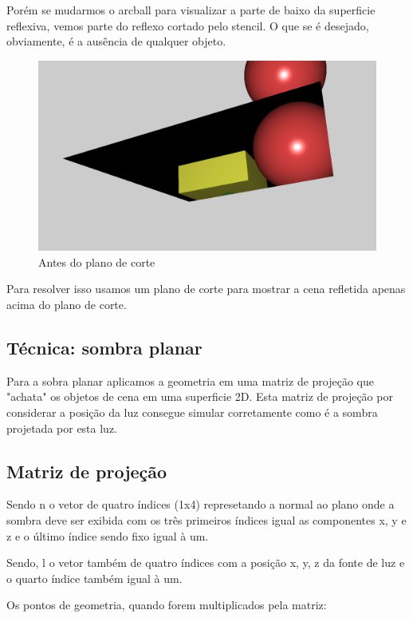 \documentclass[11pt, a4paper]{article}
\begin{document}
Porém se mudarmos o arcball para visualizar a parte de baixo da superficie reflexiva, 
vemos parte do reflexo cortado pelo stencil. O que se é desejado, obviamente, é 
a ausência de qualquer objeto.

\begin{figure}[H]
  \begin{center}
  \includegraphics[width=0.8\linewidth]{before-cut-plan.png}
  \caption{Antes do plano de corte}
  \label{fig:vaz}
  \end{center}
\end{figure}

Para resolver isso usamos um plano de corte para mostrar a cena refletida apenas
acima do plano de corte.


\subsection {Técnica: sombra planar}

Para a sobra planar aplicamos a geometria em uma matriz de projeção que "achata"
os objetos de cena em uma superficie 2D. Esta matriz de projeção por considerar a posição da luz
consegue simular corretamente como é a sombra projetada por esta luz.

\subsection{Matriz de projeção}

Sendo n o vetor de quatro índices (1x4) represetando a normal ao plano onde a sombra deve
ser exibida com os três primeiros índices igual as componentes x, y e z e o último
índice sendo fixo igual à um.

Sendo, l o vetor também de quatro índices com a posição x, y, z da fonte de luz 
e o quarto índice também igual à um.

Os pontos de geometria, quando forem multiplicados pela matriz:
\end{document}
